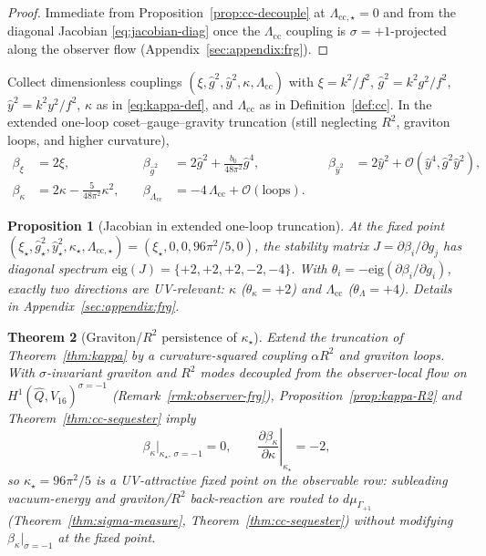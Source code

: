 \documentclass[aps,prd,onecolumn,amsmath,amssymb,nofootinbib,11pt]{revtex4-2}
\numberwithin{equation}{section}
\theoremstyle{plain}
\newtheorem{theorem}{Theorem}[section]
\newtheorem{proposition}[theorem]{Proposition}
\theoremstyle{definition}
\theoremstyle{remark}
\begin{document}
\begin{proof}
Immediate from Proposition~\ref{prop:cc-decouple} at
$\Lambda_{\mathrm{cc},\star}=0$ and from the diagonal Jacobian
\eqref{eq:jacobian-diag} once the $\Lambda_{\mathrm{cc}}$ coupling is
$\sigma=+1$-projected along the observer flow
(Appendix~\ref{sec:appendix:frg}).
\end{proof}

Collect dimensionless couplings
$(\xi,\hat g^2,\hat y^2,\kappa,\Lambda_{\mathrm{cc}})$ with
$\xi=k^2/f^2$, $\hat g^2=k^2 g^2/f^2$, $\hat y^2=k^2 y^2/f^2$,
$\kappa$ as in \eqref{eq:kappa-def}, and $\Lambda_{\mathrm{cc}}$ as in
Definition~\ref{def:cc}. In the extended one-loop coset--gauge--gravity
truncation (still neglecting $R^2$, graviton loops, and higher curvature),
\begin{equation}\label{eq:frg-system}
\begin{aligned}
  \beta_{\xi}&=2\xi,
  &\quad
  \beta_{\hat g^2}&=2\hat g^2+\frac{b_0}{48\pi^2}\hat g^4,
  &\quad
  \beta_{\hat y^2}&=2\hat y^2+\mathcal{O}(\hat y^4,\hat g^2\hat y^2),
  \\[4pt]
  \beta_{\kappa}&=2\kappa-\frac{5}{48\pi^2}\kappa^2,
  &\quad
  \beta_{\Lambda_{\mathrm{cc}}}&=-4\,\Lambda_{\mathrm{cc}}+\mathcal{O}(\text{loops}).
\end{aligned}
\end{equation}

\begin{proposition}[Jacobian in extended one-loop truncation]
\label{prop:frg-jacobian}
At the fixed point
$(\xi_\star,\hat g^2_\star,\hat y^2_\star,\kappa_\star,\Lambda_{\mathrm{cc},\star})
=(\xi_\star,0,0,96\pi^2/5,0)$, the stability matrix
$J=\partial\beta_i/\partial g_j$ has diagonal spectrum
$\mathrm{eig}(J)=\{+2,+2,+2,-2,-4\}$. With
$\theta_i=-\mathrm{eig}(\partial\beta_i/\partial g_i)$, exactly two directions
are UV-relevant: $\kappa$ ($\theta_\kappa=+2$) and
$\Lambda_{\mathrm{cc}}$ ($\theta_{\Lambda}=+4$). Details in
Appendix~\ref{sec:appendix:frg}.
\end{proposition}

\begin{theorem}[Graviton/$R^2$ persistence of $\kappa_\star$]
\label{thm:kappa-persistence}
Extend the truncation of Theorem~\ref{thm:kappa} by a curvature-squared
coupling $\alpha R^2$ and graviton loops. With
$\sigma$-invariant graviton and $R^2$ modes decoupled from the observer-local
flow on $H^1(\hat Q,V_{16})^{\sigma=-1}$
(Remark~\ref{rmk:observer-frg}), Proposition~\ref{prop:kappa-R2} and
Theorem~\ref{thm:cc-sequester} imply
\begin{equation}\label{eq:kappa-persist}
  \beta_\kappa\Big|_{\kappa_\star,\,\sigma=-1}=0,
  \qquad
  \left.\frac{\partial\beta_\kappa}{\partial\kappa}\right|_{\kappa_\star}=-2,
\end{equation}
so $\kappa_\star=96\pi^2/5$ is a UV-attractive fixed point on the observable
row: subleading vacuum-energy and graviton/$R^2$ back-reaction are routed to
$d\mu_{\Gamma_{+1}}$ (Theorem~\ref{thm:sigma-measure},
Theorem~\ref{thm:cc-sequester}) without modifying
$\beta_\kappa|_{\sigma=-1}$ at the fixed point.
\end{theorem}
\end{document}
